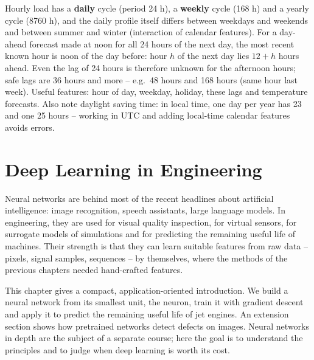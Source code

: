 \documentclass[
  letterpaper,
  DIV=11,
  numbers=noendperiod]{scrreprt}
\begin{document}
\begin{tcolorbox}[enhanced jigsaw, left=2mm, title=\textcolor{quarto-callout-caution-color}{\faFire}\hspace{0.5em}{Solution to Exercise 5}, opacityback=0, breakable, rightrule=.15mm, arc=.35mm, toptitle=1mm, colbacktitle=quarto-callout-caution-color!10!white, opacitybacktitle=0.6, coltitle=black, colframe=quarto-callout-caution-color-frame, bottomrule=.15mm, leftrule=.75mm, bottomtitle=1mm, titlerule=0mm, toprule=.15mm, colback=white]

Hourly load has a \textbf{daily} cycle (period 24 h), a \textbf{weekly}
cycle (168 h) and a yearly cycle (8760 h), and the daily profile itself
differs between weekdays and weekends and between summer and winter
(interaction of calendar features). For a day-ahead forecast made at
noon for all 24 hours of the next day, the most recent known hour is
noon of the day before: hour \(h\) of the next day lies \(12 + h\) hours
ahead. Even the lag of 24 hours is therefore unknown for the afternoon
hours; safe lags are 36 hours and more -- e.g.~48 hours and 168 hours
(same hour last week). Useful features: hour of day, weekday, holiday,
these lags and temperature forecasts. Also note daylight saving time: in
local time, one day per year has 23 and one 25 hours -- working in UTC
and adding local-time calendar features avoids errors.

\end{tcolorbox}

\chapter{Deep Learning in
Engineering}\label{deep-learning-in-engineering}

Neural networks are behind most of the recent headlines about artificial
intelligence: image recognition, speech assistants, large language
models. In engineering, they are used for visual quality inspection, for
virtual sensors, for surrogate models of simulations and for predicting
the remaining useful life of machines. Their strength is that they can
learn suitable features from raw data -- pixels, signal samples,
sequences -- by themselves, where the methods of the previous chapters
needed hand-crafted features.

This chapter gives a compact, application-oriented introduction. We
build a neural network from its smallest unit, the neuron, train it with
gradient descent and apply it to predict the remaining useful life of
jet engines. An extension section shows how pretrained networks detect
defects on images. Neural networks in depth are the subject of a
separate course; here the goal is to understand the principles and to
judge when deep learning is worth its cost.
\end{document}
